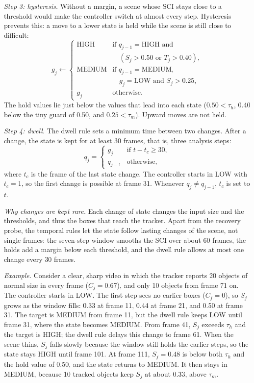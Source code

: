 \documentclass[journal]{new-aiaa}
\begin{document}
\emph{Step 3: hysteresis.} Without a margin, a scene whose SCI stays close to
a threshold would make the controller switch at almost every step.
Hysteresis prevents this: a move to a lower state is held while the scene is
still close to difficult:
\begin{equation}
g_j\leftarrow\begin{cases}
\text{HIGH}   & \text{if } q_{j-1}=\text{HIGH} \text{ and}\\
              & \quad (S_j>0.50 \text{ or } T_j>0.40),\\
\text{MEDIUM} & \text{if } q_{j-1}=\text{MEDIUM},\\
              & \quad g_j=\text{LOW} \text{ and } S_j>0.25,\\
g_j           & \text{otherwise.}
\end{cases}
\label{eq:hold}
\end{equation}
The hold values lie just below the values that lead into each state
($0.50<\tau_h$, 0.40 below the tiny guard of 0.50, and $0.25<\tau_m$).
Upward moves are not held.

\emph{Step 4: dwell.} The dwell rule sets a minimum time between two changes.
After a change, the state is kept for at least 30 frames, that is, three
analysis steps:
\begin{equation}
q_j=\begin{cases}
g_j     & \text{if } t-t_c\ge30,\\
q_{j-1} & \text{otherwise,}
\end{cases}
\label{eq:dwell}
\end{equation}
where $t_c$ is the frame of the last state change. The controller starts in
LOW with $t_c=1$, so the first change is possible at frame 31. Whenever
$q_j\ne q_{j-1}$, $t_c$ is set to $t$.

\emph{Why changes are kept rare.} Each change of state changes the input size
and the thresholds, and thus the boxes that reach the tracker. Apart from the
recovery probe, the temporal rules let the state follow lasting changes of
the scene, not single frames: the seven-step window smooths the SCI over about
60 frames, the holds add a margin below each threshold, and the dwell rule
allows at most one change every 30 frames.

\emph{Example.} Consider a clear, sharp video in which the tracker reports 20
objects of normal size in every frame ($C_j=0.67$), and only 10 objects from
frame 71 on. The controller starts in LOW. The first step sees no earlier
boxes ($C_j=0$), so $S_j$ grows as the window fills: 0.33 at frame 11, 0.44
at frame 21, and 0.50 at frame 31. The target is MEDIUM from frame 11, but the
dwell rule keeps LOW until frame 31, where the state becomes MEDIUM. From
frame 41, $S_j$ exceeds $\tau_h$ and the target is HIGH; the dwell rule delays
this change to frame 61. When the scene thins, $S_j$ falls slowly because the
window still holds the earlier steps, so the state stays HIGH until frame 101.
At frame 111, $S_j=0.48$ is below both $\tau_h$ and the hold value of 0.50,
and the state returns to MEDIUM. It then stays in MEDIUM, because 10 tracked
objects keep $S_j$ at about 0.33, above $\tau_m$.
\end{document}
